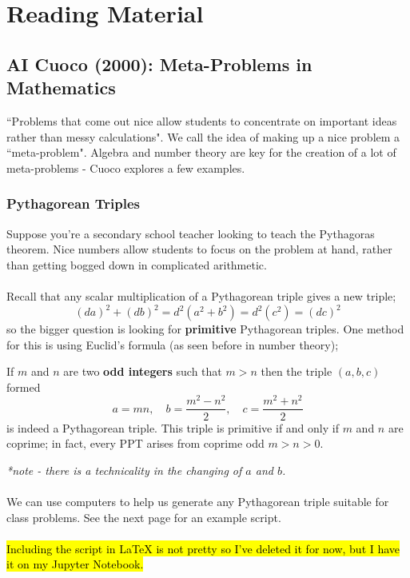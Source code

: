 \documentclass[12pt]{article}
\begin{document}
\pagebreak 

\section{Reading Material}

\subsection{AI Cuoco (2000): Meta-Problems in Mathematics}
``Problems that come out nice allow students to concentrate on important ideas rather than messy calculations". We call the idea of making up a nice problem a ``meta-problem". Algebra and number theory are key for the creation of a lot of meta-problems - Cuoco explores a few examples.

\subsubsection{Pythagorean Triples}
Suppose you're a secondary school teacher looking to teach the Pythagoras theorem. Nice numbers allow students to focus on the problem at hand, rather than getting bogged down in complicated arithmetic.\\\\
Recall that any scalar multiplication of a Pythagorean triple gives a new triple;
\begin{equation*}
    (da)^2 + (db)^2 = d^2(a^2 + b^2) = d^2(c^2) = (dc)^2
\end{equation*}
so the bigger question is looking for \textbf{primitive} Pythagorean triples. One method for this is using Euclid's formula (as seen before in number theory);
\begin{thm}{}{}
If $m$ and $n$ are two \textbf{odd integers} such that $m > n$ then the triple $(a, b, c)$ formed
\begin{equation*}
    a = mn,\quad b = \frac{m^2 - n^2}{2},\quad c = \frac{m^2 + n^2}{2}
\end{equation*}
is indeed a Pythagorean triple. This triple is primitive if and only if $m$ and $n$ are coprime; in fact, every PPT arises from coprime odd $m > n > 0$.
\end{thm}
\textit{*note - there is a technicality in the changing of $a$ and $b$.}\\\\
We can use computers to help us generate any Pythagorean triple suitable for class problems. See the next page for an example script.\\\\
\hl{Including the script in \LaTeX{} is not pretty so I've deleted it for now, but I have it on my Jupyter Notebook.}
\end{document}
